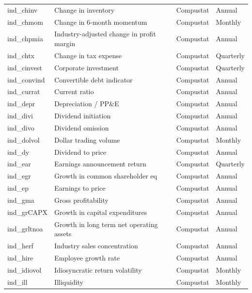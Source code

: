 \documentclass{article}
\begin{document}
\begin{center}
\begin{longtable}{llll}
			ind\_chinv\footnotemark[\value{footnote}] & Change in inventory & Compustat & Annual \\
			ind\_chmom & Change in 6-month momentum & Compustat & Monthly \\
			ind\_chpmia\footnotemark[\value{footnote}] & Industry-adjusted change in profit margin & Compustat & Annual \\
			ind\_chtx & Change in tax expense & Compustat & Quarterly \\
			ind\_cinvest & Corporate investment & Compustat & Quarterly \\
			ind\_convind & Convertible debt indicator & Compustat & Annual \\
			ind\_currat & Current ratio & Compustat & Annual \\
			ind\_depr & Depreciation / PP\&E & Compustat & Annual \\
			ind\_divi & Dividend initiation & Compustat & Annual \\
			ind\_divo & Dividend omission & Compustat & Annual \\
			ind\_dolvol & Dollar trading volume & Compustat & Monthly \\
			ind\_dy & Dividend to price & Compustat & Annual \\
			ind\_ear & Earnings announcement return & Compustat & Quarterly \\
			ind\_egr & Growth in common shareholder eq & Compustat & Annual \\
			ind\_ep & Earnings to price & Compustat & Annual \\
			ind\_gma & Gross profitability & Compustat & Annual \\
			ind\_grCAPX\footnotemark[\value{footnote}] & Growth in capital expenditures & Compustat & Annual \\
			ind\_grltnoa\footnotemark[\value{footnote}] & Growth in long term net operating assets & Compustat & Annual \\
			ind\_herf & Industry sales concentration & Compustat & Annual \\
			ind\_hire & Employee growth rate & Compustat & Annual \\
			ind\_idiovol & Idiosyncratic return volatility & Compustat & Monthly \\
			ind\_ill & Illiquidity & Compustat & Monthly \\

\end{longtable}
\end{center}
\end{document}
